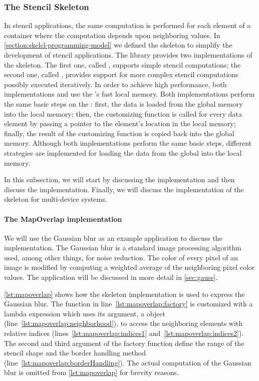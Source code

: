 \subsubsection{The Stencil Skeleton}
\label{sec:skelcl:stencil}
In stencil applications, the same computation is performed for each element of a container where the computation depends upon neighboring values.
In \autoref{section:skelcl-programming-model} we defined the \stencil skeleton to simplify the development of stencil applications.
The \SkelCL library provides two implementations of the \stencil skeleton.
The first one, called , supports simple stencil computations;
the second one, called , provides support for more complex stencil computations possibly executed iteratively.
In order to achieve high performance, both implementations  and  use the \GPU's fast local memory.
Both implementations perform the same basic steps on the \GPU:
first, the data is loaded from the global memory into the local memory;
then, the customizing function is called for every data element by passing a pointer to the element's location in the local memory;
finally, the result of the customizing function is copied back into the global memory.
Although both implementations perform the same basic steps, different strategies are implemented for loading the data from the global into the local memory.

In this subsection, we will start by discussing the  implementation and then discuss the  implementation.
Finally, we will discuss the implementation of the \stencil skeleton for multi-device systems.

\paragraph{The MapOverlap implementation}

We will use the Gaussian blur as an example application to discuss the  implementation.
The Gaussian blur is a standard image processing algorithm used, among other things, for noise reduction.
The color of every pixel of an image is modified by computing a weighted average of the neighboring pixel color values.
The application will be discussed in more detail in \autoref{sec:gauss}.

\autoref{lst:mapoverlap} shows how the  skeleton implementation is used to express the Gaussian blur.
The  function in line~\ref{lst:mapoverlap:factory} is customized with a lambda expression which uses its argument, a  object (line~\ref{lst:mapoverlap:neighborhood}), to access the neighboring elements with relative indices (lines~\ref{lst:mapoverlap:indices1} and~\ref{lst:mapoverlap:indices2}).
The second and third argument of the factory function define the range of the stencil shape and the border handling method (line~\ref{lst:mapoverlap:borderHandling}).
The actual computation of the Gaussian blur is omitted from \autoref{lst:mapoverlap} for brevity reasons.

